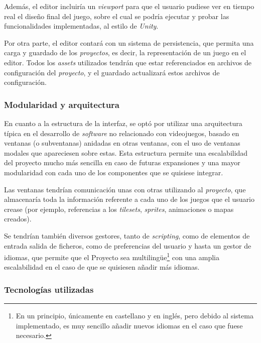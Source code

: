 Además, el editor incluiría un \textit{viewport} para que el usuario pudiese ver en tiempo real el diseño final del juego, sobre el cual se podría ejecutar y probar las funcionalidades implementadas, al estilo de \textit{Unity}.

\medskip

Por otra parte, el editor contará con un sistema de persistencia, que permita una carga y guardado de los \textit{proyectos}, es decir, la representación de un juego en el editor. Todos los \textit{assets} utilizados tendrán que estar referenciados en archivos de configuración del \textit{proyecto}, y el guardado actualizará estos archivos de configuración.

\subsubsection{Modularidad y arquitectura}
En cuanto a la estructura de la interfaz, se optó por utilizar una arquitectura típica en el desarrollo de \textit{software} no relacionado con videojuegos, basado en ventanas (o subventanas) anidadas en otras ventanas, con el uso de ventanas modales que apareciesen sobre estas. Esta estructura permite una escalabilidad del proyecto mucho más sencilla en caso de futuras expansiones y una mayor modularidad con cada uno de los componentes que se quisiese integrar.

\medskip

Las ventanas tendrían comunicación unas con otras utilizando al \textit{proyecto}, que almacenaría toda la información referente a cada uno de los juegos que el usuario crease (por ejemplo, referencias a los \textit{tilesets}, \textit{sprites}, animaciones o mapas creados).

\smallskip

Se tendrían también diversos gestores, tanto de \textit{scripting}, como de elementos de entrada salida de ficheros, como de preferencias del usuario y hasta un gestor de idiomas, que permite que el Proyecto sea multilingüe\footnote{En un principio, únicamente en castellano y en inglés, pero debido al sistema implementado, es muy sencillo añadir nuevos idiomas en el caso que fuese necesario.} con una amplia escalabilidad en el caso de que se quisiesen añadir más idiomas.

\subsubsection{Tecnologías utilizadas}

